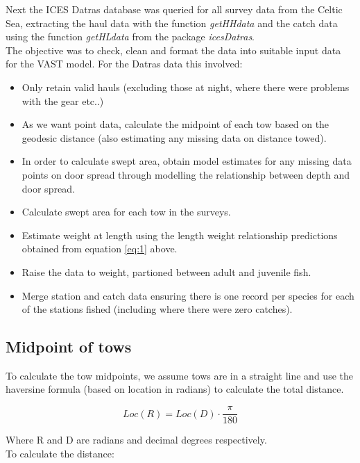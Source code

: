 \documentclass[12pt]{article}\usepackage[]{graphicx}\usepackage[]{color}
\begin{document}
Next the ICES Datras database was queried for all survey data from the Celtic
Sea, extracting the haul data with the function \textit{getHHdata} and the
catch data using the function \textit{getHLdata} from the package
\textit{icesDatras}. \\

The objective was to check, clean and format the data into suitable input data
for the VAST model. For the Datras data this involved:

\begin{itemize}
	\item Only retain valid hauls (excluding those at night, where there
		were problems with the gear etc..)
	\item As we want point data, calculate the midpoint of each tow based
		on the geodesic distance (also estimating any missing data on
		distance towed).
	\item In order to calculate swept area, obtain model estimates for any
		missing data points on door spread through modelling the
		relationship between depth and door spread.
	\item Calculate swept area for each tow in the surveys.
	\item Estimate weight at length using the length weight relationship
		predictions obtained from equation \ref{eq:1} above.
	\item Raise the data to weight, partioned between adult and juvenile fish.
	\item Merge station and catch data ensuring there is one record per
		species for each of the stations fished (including where there
		were zero catches).
\end{itemize}

\subsection{Midpoint of tows}

To calculate the tow midpoints, we assume tows are in a straight line and use
the haversine formula (based on location in radians) to calculate the total distance.

\begin{equation}
	Loc(R) = Loc(D) \cdot \frac{\pi}{180}
\end{equation}

Where R and D are radians and decimal degrees respectively. \\

To calculate the distance:
\end{document}
